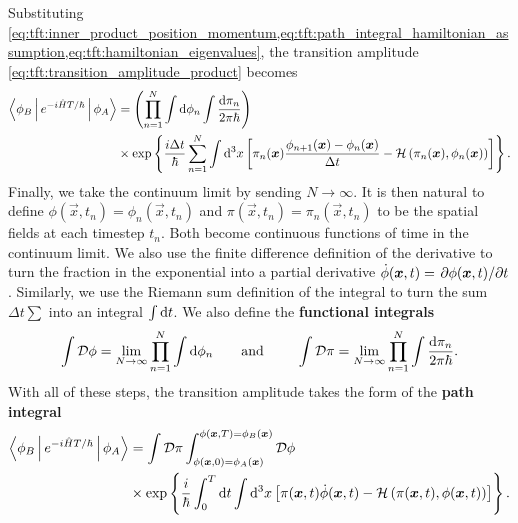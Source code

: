 Substituting \cref{eq:tft:inner_product_position_momentum,eq:tft:path_integral_hamiltonian_assumption,eq:tft:hamiltonian_eigenvalues}, the transition amplitude \eqref{eq:tft:transition_amplitude_product} becomes
\begin{equation}
\begin{split}
	\Braket{\phi_B | e^{- i \hat{H} T / \hbar} | \phi_A} &=      \left( \prod_{n=1}^N \int \mathop{}\!\mathrm{d} \phi_n \int \frac{\mathop{}\!\mathrm{d} \pi_n}{2 \pi \hbar} \right) \\
	           &\times \exp \left\{ \frac{i \Delta t}{\hbar} \sum_{n=1}^N \int \mathop{}\!\mathrm{d}^3 x \left[ \pi_n({\bm{x}}) \frac{\phi_{n+1}({\bm{x}}) - \phi_n({\bm{x}})}{\Delta t} - \mathcal{H} \left( \pi_n({\bm{x}}), \phi_n({\bm{x}}) \right) \right]
	\right\}
	.
\end{split}
\end{equation}
Finally, we take the continuum limit by sending $N \rightarrow \infty$.
It is then natural to define
$\phi(\vec{x}, t_n) = \phi_n(\vec{x}, t_n)$
and
$\pi(\vec{x}, t_n) = \pi_n(\vec{x}, t_n)$
to be the spatial fields at each timestep $t_n$.
Both become continuous functions of time in the continuum limit.
We also use the finite difference definition of the derivative to turn the fraction in the exponential into a partial derivative $\dot{\phi}({\bm{x}},t) = \pdv{\phi({\bm{x}},t)}/{t}$.
Similarly, we use the Riemann sum definition of the integral to turn the sum $\Delta t\sum$ into an integral $\int \mathop{}\!\mathrm{d} t$.
We also define the \textbf{functional integrals}
\begin{equation}
	\int \pathintdif \phi = \lim_{N \rightarrow \infty} \prod_{n=1}^{N} \int \dif \phi_n
	\qquad \text{and} \qquad
	\int \pathintdif \pi = \lim_{N \rightarrow \infty} \prod_{n=1}^{N} \int \frac{\dif \pi_n}{2 \pi \hbar} .
\label{eq:tft:functional_integral}
\end{equation}
With all of these steps, the transition amplitude takes the form of the \textbf{path integral}
\begin{equation}
\begin{split}
	\Braket{\phi_B | e^{- i \hat{H} T / \hbar} | \phi_A} &=      \int \mathcal{D} \pi \int_{\phi({\bm{x}}, 0)=\phi_A({\bm{x}})}^{\phi({\bm{x}},T)=\phi_B({\bm{x}})} \mathcal{D} \phi \\
	           &\times \exp \left\{ \frac{i}{\hbar} \int_0^T \mathop{}\!\mathrm{d} t \int \mathop{}\!\mathrm{d}^3 x \left[ \pi({\bm{x}}, t) \dot{\phi}({\bm{x}}, t) - \mathcal{H} \left( \pi({\bm{x}}, t), \phi({\bm{x}}, t) \right) \right] \right\} .
\end{split}
\label{eq:tft:path_integral_hamiltonian}
\end{equation}

